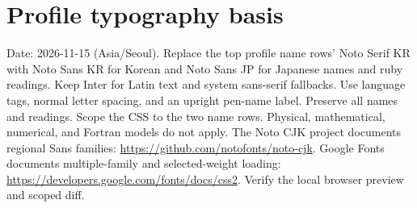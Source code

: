 \documentclass{article}
\begin{document}
\section*{Profile typography basis}
Date: 2026-11-15 (Asia/Seoul).
Replace the top profile name rows' Noto Serif KR with Noto Sans KR
for Korean and Noto Sans JP for Japanese names and ruby readings.
Keep Inter for Latin text and system sans-serif fallbacks.
Use language tags, normal letter spacing, and an upright pen-name label.
Preserve all names and readings. Scope the CSS to the two name rows.
Physical, mathematical, numerical, and Fortran models do not apply.
The Noto CJK project documents regional Sans families:
\url{https://github.com/notofonts/noto-cjk}.
Google Fonts documents multiple-family and selected-weight loading:
\url{https://developers.google.com/fonts/docs/css2}.
Verify the local browser preview and scoped diff.
\end{document}
